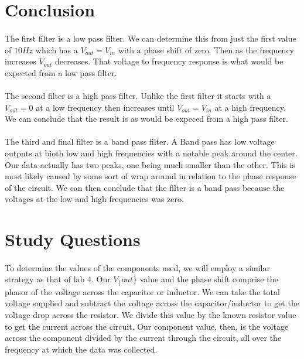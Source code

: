 \documentclass{article}
\begin{document}
\clearpage

\section*{Conclusion}
\paragraph{}
The first filter is a low pass filter. We can determine this from just the first value of $10Hz$ which has a 
$V_{out} = V_{in}$ with a phase shift of zero. Then as the frequency increases $V_{out}$ decreases. That
voltage to frequency response is what would be expected from a low pass filter.
\paragraph{}
The second filter is a high pass filter. Unlike the first filter it starts with a $V_{out} = 0$ at a low frequency
 then increases until $V_{out} = V_{in}$ at a high frequency. We can conclude that the result is as would be 
 expeced from a high pass filter.
 \paragraph{}
 The third and final filter is a band pass filter. A Band pass has low voltage outputs at bioth low and high frequencies 
 with a notable peak around the center. Our data actually has two peaks, one being much smaller than the other. This 
 is most likely caused by some sort of wrap around in relation to the phase response of the circuit. We can then conclude
 that the filter is a band pass because the voltages at the low and high frequencies was zero.


\section*{Study Questions}
\paragraph{}
To determine the values of the components used, we will employ a similar strategy as that of lab 4. Our $V_\{out\}$
 value and the phase shift comprise the phasor of the voltage across the capacitor or inductor. We can take the 
 total voltage supplied and subtract the voltage across the capacitor/inductor to get the voltage drop across the 
 resistor. We divide this value by the known resistor value to get the current across the circuit. Our component value,
 then, is the voltage across the component divided by the current through the circuit, all over the frequency at which 
 the data was collected.
\end{document}
